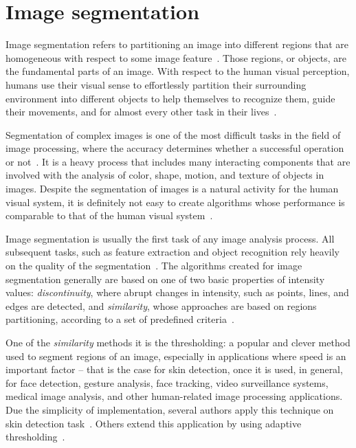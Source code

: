 \section{Image segmentation}
\label{sec:image_segmentation}
Image segmentation refers to partitioning an image into different regions that are homogeneous with respect to some image feature~\citep{gonzalez:02}. Those regions, or objects, are the fundamental parts of an image. With respect to the human visual perception, humans use their visual sense to effortlessly partition their surrounding environment into different objects to help themselves to recognize them, guide their movements, and for almost every other task in their lives~\citep{konstantinos:00}.

Segmentation of complex images is one of the most difficult tasks in the field of image processing, where the accuracy determines whether a successful operation or not~\citep{gonzalez:02}. It is a heavy process that includes many interacting components that are involved with the analysis of color, shape, motion, and texture of objects in images. Despite the segmentation of images is a natural activity for the human visual system, it is definitely not easy to create algorithms whose performance is comparable to that of the human visual system~\citep{konstantinos:00}.

Image segmentation is usually the first task of any image analysis process. All subsequent tasks, such as feature extraction and object recognition rely heavily on the quality of the segmentation~\citep{konstantinos:00}. The algorithms created for image segmentation generally are based on one of two basic properties of intensity values: \emph{discontinuity}, where abrupt changes in intensity, such as points, lines, and edges are detected, and \emph{similarity}, whose approaches are based on regions partitioning, according to a set of predefined criteria~\citep{gonzalez:02}.

One of the \emph{similarity} methods it is the thresholding: a popular and clever method used to segment regions of an image, especially in applications where speed is an important factor -- that is the case for skin detection, once it is used, in general, for face detection, gesture analysis, face tracking, video surveillance systems, medical image analysis, and other human-related image processing applications. Due the simplicity of implementation, several authors apply this technique on skin detection task~\citep{kovac:03, chai:99, basilio:11, kaur:12, shaik:15, kumar:15}. Others extend this application by using adaptive thresholding~\citep{yogarajah:11, tan:12}.

